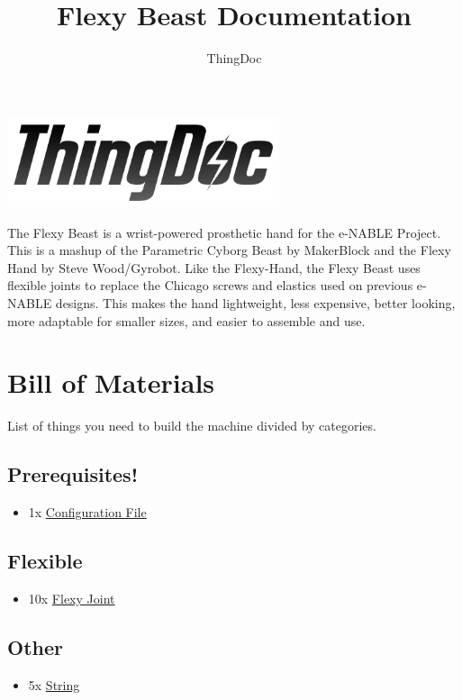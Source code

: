 \documentclass[11pt]{article}
\title{Flexy Beast Documentation}
\author{ThingDoc}
\begin{document}
\maketitle
\begin{center}
\includegraphics[width=8cm]{logo.png}
\end{center}
The Flexy Beast is a wrist-powered prosthetic hand for the e-NABLE Project. This is a mashup of the Parametric Cyborg Beast by MakerBlock and the Flexy Hand by Steve Wood/Gyrobot. Like the Flexy-Hand, the Flexy Beast uses flexible joints to replace the Chicago screws and elastics used on previous e-NABLE designs. This makes the hand lightweight, less expensive, better looking, more adaptable for smaller sizes, and easier to assemble and use.

\newpage

\tableofcontents

\newpage

\section{Bill of Materials}
List of things you need to build the machine divided by categories.

\subsection{Prerequisites!}
\begin{itemize}
\item 1x \hyperlink{thing_config_file}{Configuration File}
\end{itemize}

\subsection{Flexible}
\begin{itemize}
\item 10x \hyperlink{thing_flexy\_joint}{Flexy Joint}
\end{itemize}

\subsection{Other}
\begin{itemize}
\item 5x \hyperlink{thing_string}{String}
\end{itemize}
\end{document}
